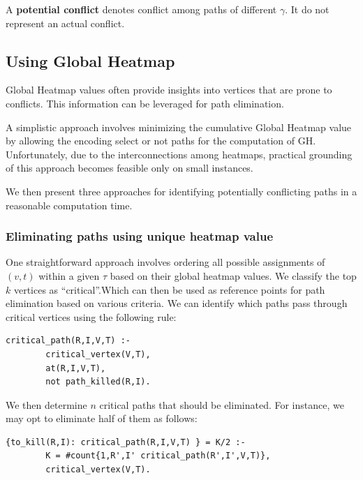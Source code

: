 \begin{definition}
    A \textbf{potential conflict} denotes conflict among paths of different \(\gamma\). It do not represent an actual conflict.
\end{definition}



\subsection{Using Global Heatmap}

Global Heatmap values often provide insights into vertices that are prone to conflicts. This information can be leveraged for path elimination. 

A simplistic approach involves minimizing the cumulative Global Heatmap value by allowing the encoding select or not paths for the computation of GH. Unfortunately, due to the interconnections among heatmaps, practical grounding of this approach becomes feasible only on small instances.

We then present three approaches for identifying potentially conflicting paths in a reasonable computation time.

\subsubsection{Eliminating paths using unique heatmap value}

One straightforward approach involves ordering all possible assignments of \((v, t)\) within a given \(\tau\) based on their global heatmap values. We classify the top \(k\) vertices as ``critical''.Which can then be used as reference points for path elimination based on various criteria. We can identify which paths pass through critical vertices using the following rule:

\begin{minipage}[H]{\linewidth}
\begin{lstlisting}[style=mystyle]
    critical_path(R,I,V,T) :- 
        critical_vertex(V,T), 
        at(R,I,V,T), 
        not path_killed(R,I).
\end{lstlisting}
\end{minipage}


We then determine \(n\) critical paths that should be eliminated. For instance, we may opt to eliminate half of them as follows:

\begin{minipage}[H]{\linewidth}
\begin{lstlisting}[style=mystyle]
    {to_kill(R,I): critical_path(R,I,V,T) } = K/2 :-
        K = #count{1,R',I' critical_path(R',I',V,T)},
        critical_vertex(V,T).
\end{lstlisting}
\end{minipage}

